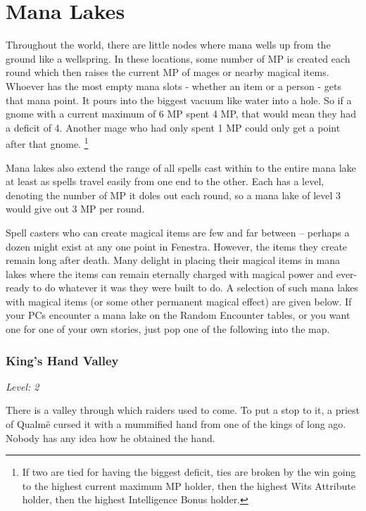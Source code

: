 \section{Mana Lakes}\label{mana_lake}

\begin{multicols}{2}

Throughout the world, there are little nodes where mana wells up from the ground like a wellspring.  In these locations, some number of MP is created each round which then raises the current MP of mages or nearby magical items.  Whoever has the most empty mana slots - whether an item or a person - gets that mana point.  It pours into the biggest vacuum like water into a hole.  So if a gnome with a current maximum of 6 MP spent 4 MP, that would mean they had a deficit of 4.  Another mage who had only spent 1 MP could only get a point after that gnome. 
\footnote{If two are tied for having the biggest deficit, ties are broken by the win going to the highest current maximum MP holder, then the highest Wits Attribute holder, then the highest Intelligence Bonus holder.}

Mana lakes also extend the range of all spells cast within to the entire mana lake at least as spells travel easily from one end to the other.  Each has a level, denoting the number of MP it doles out each round, so a mana lake of level 3 would give out 3 MP per round.

Spell casters who can create magical items are few and far between -- perhaps a dozen might exist at any one point in Fenestra.  However, the items they create remain long after death.  Many delight in placing their magical items in mana lakes where the items can remain eternally charged with magical power and ever-ready to do whatever it was they were built to do.  A selection of such mana lakes with magical items (or some other permanent magical effect) are given below.  If your PCs encounter a mana lake on the Random Encounter tables, or you want one for one of your own stories, just pop one of the following into the map.

\subsubsection{King's Hand Valley}

\textit{Level: 2}

There is a valley through which raiders used to come.  To put a stop to it, a priest of Qualm\"{e} cursed it with a mummified hand from one of the kings of long ago.  Nobody has any idea how he obtained the hand.


\end{multicols}
